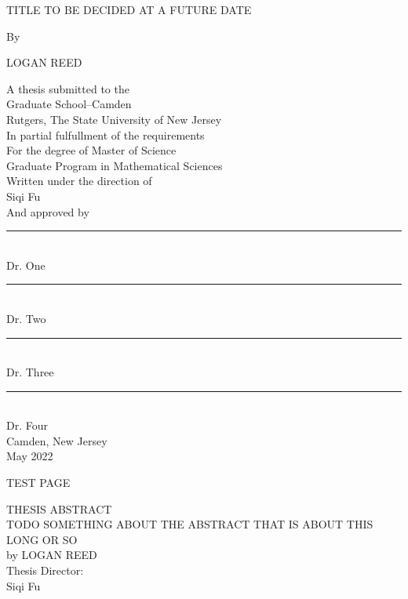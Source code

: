 \documentclass[12pt]{report}
\numberwithin{definition}{section}
\begin{document}
  \doublespacing
  
\begin{titlepage}

   \begin{center}
      

      TITLE TO BE DECIDED AT A FUTURE DATE

            
     
       By
              


      LOGAN REED

     
            
        A thesis submitted to the \\
       Graduate School–Camden\\
       Rutgers, The State University of New Jersey\\
       In partial fulfullment of the requirements\\
       For the degree of Master of Science\\
       Graduate Program in Mathematical Sciences \\
       Written under the direction of \\
       Siqi Fu\\
       And approved by \\
       \noindent\rule{4cm}{0.4pt}\\
       Dr. One\\
      \noindent\rule{4cm}{0.4pt}\\
       Dr. Two\\
           \noindent\rule{4cm}{0.4pt}\\
       Dr. Three\\
                \noindent\rule{4cm}{0.4pt}\\
       Dr. Four\\
         \vspace{0.8cm}
       Camden, New Jersey\\
       May 2022
            
       \vspace{0.8cm}
     
  
        
            
   \end{center}
   
\end{titlepage}




\break
TEST PAGE

  \begin{center}

\break
  THESIS ABSTRACT\\
 
    TODO SOMETHING ABOUT THE ABSTRACT THAT IS ABOUT THIS LONG OR SO \\
         by LOGAN REED\\
     
     Thesis Director: \\
     Siqi Fu
  \end {center}
\end{document}
